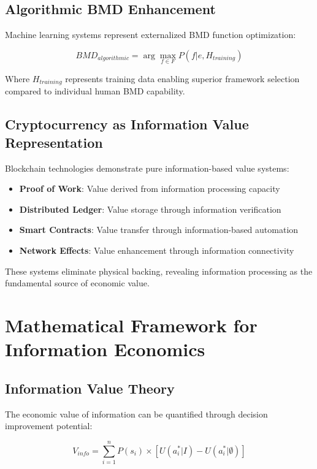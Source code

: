 \documentclass[12pt,a4paper]{article}
\begin{document}
\subsection{Algorithmic BMD Enhancement}

Machine learning systems represent externalized BMD function optimization:

\begin{equation}
BMD_{algorithmic} = \arg\max_{f \in F} P(f | e, H_{training})
\end{equation}

Where $H_{training}$ represents training data enabling superior framework selection compared to individual human BMD capability.

\subsection{Cryptocurrency as Information Value Representation}

Blockchain technologies demonstrate pure information-based value systems:

\begin{itemize}
\item \textbf{Proof of Work}: Value derived from information processing capacity
\item \textbf{Distributed Ledger}: Value storage through information verification
\item \textbf{Smart Contracts}: Value transfer through information-based automation
\item \textbf{Network Effects}: Value enhancement through information connectivity
\end{itemize}

These systems eliminate physical backing, revealing information processing as the fundamental source of economic value.

\section{Mathematical Framework for Information Economics}

\subsection{Information Value Theory}

The economic value of information can be quantified through decision improvement potential:

\begin{equation}
V_{info} = \sum_{i=1}^{n} P(s_i) \times [U(a^*_i | I) - U(a^*_i | \emptyset)]
\end{equation}
\end{document}
